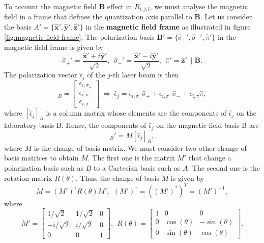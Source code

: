 To account the magnetic field $ \mathbf{B} $ effect in $ R_{i,j,l} $, we must analyse the magnetic field in a frame that defines the quantization axis parallel to $ \mathbf{B} $. Let us consider the basis $ A' = \{\mathbf{\hat{x}}', \mathbf{\hat{y}}', \mathbf{\hat{z}}'\} $ in the \textbf{magnetic field frame} as illustrated in figure \ref{fig:magnetic-field-frame}. The polarization basis $ \mathbf{B}' = \{\hat{\sigma}_{+}', \hat{\sigma}_{-}', \hat{\pi}' \} $ in the magnetic field frame is given by
\begin{equation}
    \hat{\sigma}_+' = \frac{\mathbf{\hat{x}'} + i\mathbf{\hat{y}}'}{\sqrt{2}},\ \ \hat{\sigma}_-' = \frac{\mathbf{\hat{x}'} - i\mathbf{\hat{y}}'}{\sqrt{2}},\ \ \hat{\pi}' = \mathbf{\hat{z}}' \| \mathbf{B}.
\end{equation}
The polarization vector $ \hat{\epsilon}_j $ of the $ j $-th laser beam is then
\begin{equation}
    [\hat{\epsilon}_j]_B = \left[ \begin{matrix} \epsilon_{i,\sigma_+} \\ \epsilon_{i,\sigma_-} \\ \epsilon_{i,\pi} \end{matrix} \right]\ \Rightarrow\ \hat{\epsilon}_j = \epsilon_{i,\sigma_+} \hat{\sigma}_{+} + \epsilon_{i,\sigma_-} \hat{\sigma}_{-} +  \epsilon_{i,\pi} \hat{\pi},
\end{equation}
where $ [\hat{\epsilon}_j]_B $ is a column matrix whose elements are the components of $ \hat{\epsilon}_j $ on the laboratory basis B. Hence, the components of $ \hat{\epsilon}_j $ on the magnetic field basis B are
\begin{equation}
    [\hat{\epsilon}_j]_B' = M [\hat{\epsilon}_j]_B,
\end{equation}
where $ M $ is the change-of-basis matrix. We must consider two other change-of-basis matrices to obtain $ M $. The first one is the matrix $ M' $ that change a polarization basis such as $ B $ to a Cartesian basis such as $ A $. The second one is the rotation matrix $ R(\theta) $. Thus, the change-of-basis $ M $ is given by
\begin{equation}
    M = (M')^{\dagger}R(\theta)M',\ \ (M')^{\dagger} = ((M')^*)^T = (M')^{-1},
\end{equation}
where
\begin{equation}
    M' = \left[ \begin{matrix}
        1/\sqrt{2} & 1/\sqrt{2} & 0 \\
        -i/\sqrt{2} & i/\sqrt{2} & 0 \\
        0 & 0 & 1
    \end{matrix} \right],\ \
    R(\theta) = \left[ \begin{matrix}
        1 & 0 & 0 \\
        0 & \cos(\theta) & -\sin(\theta) \\
        0 & \sin(\theta) & \cos(\theta)
    \end{matrix} \right].
\end{equation}

